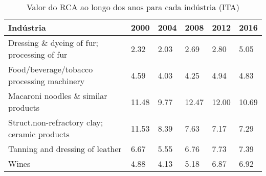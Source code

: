 \begin{table}
\centering
\caption{Valor do RCA ao longo dos anos para cada indústria (ITA)}
\label{tab:ex3-tempo-ITA}
\begin{tabular}{p{6cm}p{1.5cm}p{1.5cm}p{1.5cm}p{1.5cm}p{1.5cm}}
\toprule
                                   Indústria &  2000 & 2004 &  2008 &  2012 &  2016 \\
\midrule
 Dressing \& dyeing of fur; processing of fur &  2.32 & 2.03 &  2.69 &  2.80 &  5.05 \\
  Food/beverage/tobacco processing machinery &  4.59 & 4.03 &  4.25 &  4.94 &  4.83 \\
         Macaroni noodles \& similar products & 11.48 & 9.77 & 12.47 & 12.00 & 10.69 \\
Struct.non-refractory clay; ceramic products & 11.53 & 8.39 &  7.63 &  7.17 &  7.29 \\
             Tanning and dressing of leather &  6.67 & 5.55 &  6.76 &  7.73 &  7.39 \\
                                       Wines &  4.88 & 4.13 &  5.18 &  6.87 &  6.92 \\
\bottomrule
\end{tabular}
\end{table}
